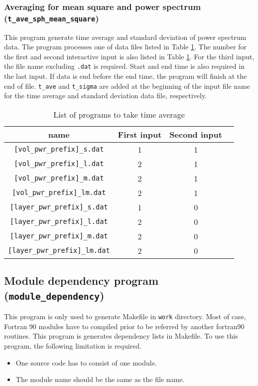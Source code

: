 \subsubsection{Averaging for mean square and power spectrum \\
 ({\tt t\_ave\_sph\_mean\_square})}
\label{sec:ave_mean_square}
This program generate time average and standard deviation of power spectrum data. The program processes one of data files listed in Table \ref{table:time_averages_sprectr}. The number for the first and second interactive input is also listed in Table \ref{table:time_averages_sprectr}. For the third input, the file name excluding \verb|.dat| is required. Start and end time is also required in the last input. If data is end before the end time, the program will finish at the end of file. \verb|t_ave| and \verb|t_sigma| are added at the beginning of the input file name for the time average and standard deviation data file, respectively.
%
\begin{table}[htp]
\caption{List of programs to take time average}
\begin{center} 
\begin{tabular}{|c|c|c|c|}
\hline
 name & First input & Second input \\ \hline \hline
\verb|[vol_pwr_prefix]_s.dat| & 1 & 1 \\ \hline
\verb|[vol_pwr_prefix]_l.dat| & 2 & 1 \\
\verb|[vol_pwr_prefix]_m.dat| & 2 & 1 \\
\verb|[vol_pwr_prefix]_lm.dat| & 2 & 1 \\ \hline
\verb|[layer_pwr_prefix]_s.dat| & 1 & 0  \\ \hline
\verb|[layer_pwr_prefix]_l.dat| & 2 & 0 \\
\verb|[layer_pwr_prefix]_m.dat| & 2 & 0 \\
\verb|[layer_pwr_prefix]_lm.dat| & 2 & 0 \\ \hline
\end{tabular}
\end{center}
\label{table:time_averages_sprectr}
\end{table}
%

\subsection{Module dependency program ({\tt module\_dependency})}
\label{sec:module_dependency}
This program is only used to generate Makefile in {\tt work} directory. Most of case, Fortran 90 modules have to compiled prior to be referred by another fortran90 routines. This program is generates dependency lists in Makefile. To use this program, the following limitation is required.
\begin{itemize}
\item One source code has to consist of one module.
\item The module name should be the same as the file name.
\end{itemize}
%

